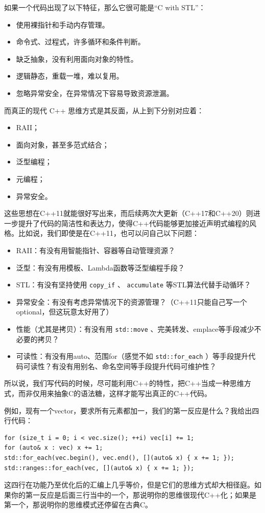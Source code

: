 如果一个代码出现了以下特征，那么它很可能是“C with STL”：
\begin{itemize}
  \item 使用裸指针和手动内存管理。
  \item 命令式、过程式，许多循环和条件判断。
  \item 缺乏抽象，没有利用面向对象的特性。
  \item 逻辑静态，重载一堆，难以复用。
  \item 忽略异常安全，在异常情况下容易导致资源泄漏。
\end{itemize}
而真正的现代 C++ 思维方式是其反面，从上到下分别对应着：
\begin{itemize}
  \item RAII；
  \item 面向对象，甚至多范式结合；
  \item 泛型编程；
  \item 元编程；
  \item 异常安全。
\end{itemize}

这些思想在C++11就能很好写出来，而后续两次大更新（C++17和C++20）则进一步提升了代码的简洁性和表达力，使得C++代码能够更加接近声明式编程的风格。比如说，我们即使是在C++11，也可以问自己以下问题：
\begin{itemize}
    \item RAII：有没有用智能指针、容器等自动管理资源？
    \item 泛型：有没有用模板、Lambda函数等泛型编程手段？
    \item STL：有没有坚持使用 \texttt{copy\_if} 、 \texttt{accumulate} 等STL算法代替手动循环？
    \item 异常安全：有没有考虑异常情况下的资源管理？（C++11只能自己写一个optional，但这玩意太好用了）
    \item 性能（尤其是拷贝）：有没有用 \texttt{std::move} 、完美转发、emplace等手段减少不必要的拷贝？
    \item 可读性：有没有用auto、范围for（感觉不如 \texttt{std::for\_each} ）等手段提升代码可读性？有没有用别名、命名空间等手段提升代码可维护性？
\end{itemize}

所以说，我们写代码的时候，尽可能利用C++的特性，把C++当成一种思维方式，而非仅用来抽象C的语法糖，这样才能写出真正的C++代码。

例如，现有一个vector，要求所有元素都加一，我们的第一反应是什么？我给出四行代码：
\begin{verbatim}
for (size_t i = 0; i < vec.size(); ++i) vec[i] += 1;
for (auto& x : vec) x += 1;
std::for_each(vec.begin(), vec.end(), [](auto& x) { x += 1; });
std::ranges::for_each(vec, [](auto& x) { x += 1; });
\end{verbatim}
这四行在功能乃至优化后的汇编上几乎等价，但是它们的思维方式却大相径庭。如果你的第一反应是后面三行当中的一个，那说明你的思维很现代C++化；如果是第一个，那说明你的思维模式还停留在古典C。

